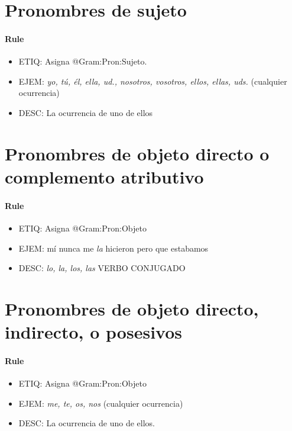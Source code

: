 \documentclass[11pt]{report}
\begin{document}
\section{Pronombres de sujeto}
\paragraph*{Rule}
\begin{itemize}
\item ETIQ: Asigna @Gram:Pron:Sujeto.
\item EJEM: \emph{yo, tú, él, ella, ud., nosotros, vosotros, ellos, ellas, uds.} (cualquier ocurrencia)
\item DESC: La ocurrencia de uno de ellos
\end{itemize}

\section{Pronombres de objeto directo o complemento atributivo}
\paragraph*{Rule}
\begin{itemize}
\item ETIQ: Asigna @Gram:Pron:Objeto
\item EJEM: mí nunca me \emph{la} hicieron pero que estabamos
\item DESC: \emph{lo, la, los, las} VERBO CONJUGADO
\end{itemize}

\section{Pronombres de objeto directo, indirecto, o posesivos}
\paragraph*{Rule}
\begin{itemize}
\item ETIQ: Asigna @Gram:Pron:Objeto
\item EJEM: \emph{me, te, os, nos} (cualquier ocurrencia)
\item DESC: La ocurrencia de uno de ellos.
\end{itemize}
\end{document}
